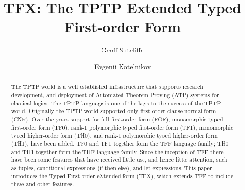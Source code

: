 \documentclass{easychair}
\begin{document}
\title{TFX: The TPTP Extended Typed First-order Form}
\author{
    Geoff Sutcliffe
\and
    Evgenii Kotelnikov
}
\clearpage
\maketitle

\begin{abstract}
The TPTP world is a well established infrastructure that supports research, 
development, and deployment of Automated Theorem Proving (ATP) systems for 
classical logics. 
The TPTP language is one of the keys to the success of the TPTP world. 
Originally the TPTP world supported only first-order clause normal form (CNF). 
Over the years support for full first-order form (FOF), monomorphic typed 
first-order form (TF0), rank-1 polymorphic typed first-order form (TF1), 
monomorphic typed higher-order form (TH0), and rank-1 polymorphic typed 
higher-order form (TH1), have been added. 
TF0 and TF1 together form the TFF language family; TH0 and TH1 together form 
the THF language family. 
Since the inception of TFF there have been some features that have received 
little use, and hence little attention, such as tuples, conditional 
expressions (if-then-else), and let expressions. 
This paper introduces the Typed First-order eXtended form (TFX), which extends
TFF to include these and other features. 
\end{abstract}

\newcommand{\binding}[2]{{#1}={#2}}
\newcommand{\ite}[3]{\mathtt{if}\;{#1}\;\allowbreak\mathtt{then}\;{#2}\;\allowbreak\mathtt{else}\;{#3}}
\newcommand{\letin}[3]{\mathtt{let}\;\binding{#1}{#2}\;\allowbreak\mathtt{in}\;{#3}}
\newcommand{\letinpar}[5]{\mathtt{let}\;\binding{#1}{#2};\;\binding{#3}{#4}\;\mathtt{in}\;{#5}}
\newcommand{\letindef}[2]{\mathtt{let}\;{#1}\;\allowbreak\mathtt{in}\;{#2}}
\newcommand{\letnl}[3]{\begin{aligned}[t]\mathtt{let}\;&\binding{#1}{#2}\\[-0.2em]\mathtt{in}\;&{#3}\end{aligned}}
\newcommand{\letinnl}[3]{\begin{aligned}[t]&\mathtt{let}\;\binding{#1}{#2}\;\mathtt{in}\\[-0.2em]&\quad{#3}\end{aligned}}
\newcommand{\itenll}[3]{\begin{aligned}[t]&\mathtt{if}\;{#1}\\[-0.2em]&\mathtt{then}\;{#2}\\[-0.2em]&\mathtt{else}\;{#3}\end{aligned}}
\newcommand{\tuple}[1]{({#1})}
\end{document}
